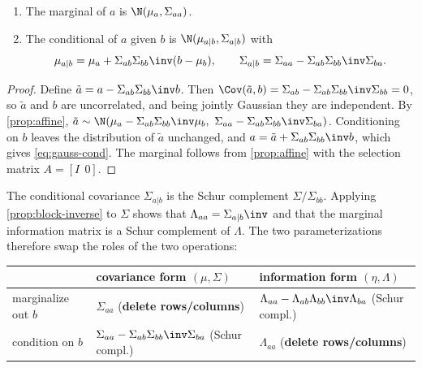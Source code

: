 \begin{theorem}
\label{thm:gauss-cond}
\begin{enumerate}
  \item The marginal of $a$ is $\N(\mu_a, \Sigma_{aa})$.
  \item The conditional of $a$ given $b$ is $\N(\mu_{a|b}, \Sigma_{a|b})$ with
  \begin{equation}
    \mu_{a|b} = \mu_a + \Sigma_{ab}\Sigma_{bb}\inv (b - \mu_b), \qquad
    \Sigma_{a|b} = \Sigma_{aa} - \Sigma_{ab}\Sigma_{bb}\inv\Sigma_{ba}.
    \label{eq:gauss-cond}
  \end{equation}
\end{enumerate}
\end{theorem}
\begin{proof}
Define $\tilde a = a - \Sigma_{ab}\Sigma_{bb}\inv b$. Then
$\Cov(\tilde a, b) = \Sigma_{ab} - \Sigma_{ab}\Sigma_{bb}\inv\Sigma_{bb} = 0$, so $\tilde a$ and $b$ are
uncorrelated, and being jointly Gaussian they are independent. By \cref{prop:affine},
$\tilde a \sim \N(\mu_a - \Sigma_{ab}\Sigma_{bb}\inv\mu_b,\ \Sigma_{aa} - \Sigma_{ab}\Sigma_{bb}\inv\Sigma_{ba})$.
Conditioning on $b$ leaves the distribution of $\tilde a$ unchanged, and $a = \tilde a + \Sigma_{ab}\Sigma_{bb}\inv b$,
which gives \eqref{eq:gauss-cond}. The marginal follows from \cref{prop:affine} with the selection
matrix $A = [I\ \ 0]$.
\end{proof}

The conditional covariance $\Sigma_{a|b}$ is the Schur complement $\Sigma/\Sigma_{bb}$. Applying
\cref{prop:block-inverse} to $\Sigma$ shows that $\Lambda_{aa} = \Sigma_{a|b}\inv$ and that the marginal
information matrix is a Schur complement of $\Lambda$. The two parameterizations therefore swap the
roles of the two operations:

\begin{center}\small
\begin{tabular}{@{}lll@{}}
\toprule
 & covariance form $(\mu, \Sigma)$ & information form $(\eta, \Lambda)$ \\
\midrule
marginalize out $b$ & $\Sigma_{aa}$ \hfill(\textbf{delete rows/columns}) & $\Lambda_{aa} - \Lambda_{ab}\Lambda_{bb}\inv\Lambda_{ba}$ \hfill(Schur compl.) \\
condition on $b$ & $\Sigma_{aa} - \Sigma_{ab}\Sigma_{bb}\inv\Sigma_{ba}$ \hfill(Schur compl.) & $\Lambda_{aa}$ \hfill(\textbf{delete rows/columns}) \\
\bottomrule
\end{tabular}
\end{center}

